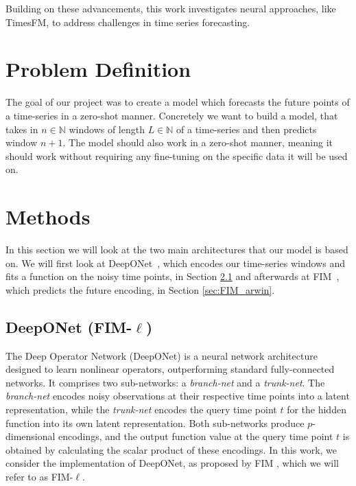 \documentclass{article}
\theoremstyle{plain}
\theoremstyle{definition}
\theoremstyle{remark}
\begin{document}
Building on these advancements, this work investigates neural approaches, like TimesFM, to address challenges in time series forecasting.

\section{Problem Definition}
The goal of our project was to create a model which forecasts the future points of a time-series in a zero-shot manner. Concretely we want to build a model, that takes in $n \in \mathbb{N}$ windows of length $L\in \mathbb{N}$ of a time-series and then predicts window $n+1$. The model should also work in a zero-shot manner, meaning it should work without requiring any fine-tuning on the specific data it will be used on. 

\section{Methods}
In this section we will look at the two main architectures that our model is based on. We will first look at DeepONet~\cite{Deeponet}, which encodes our time-series windows and fits a function on the noisy time points, in Section \ref{sec:DeepONet} and afterwards at FIM~\cite{fim-l}, which predicts the future encoding, in Section \ref{sec:FIM_arwin}.

\subsection{DeepONet (FIM-$\ell$)}\label{sec:DeepONet}
The Deep Operator Network (DeepONet) \cite{Deeponet} is a neural network architecture designed to learn nonlinear operators, outperforming standard fully-connected networks. It comprises two sub-networks: a \emph{branch-net} and a \emph{trunk-net}. 
The \emph{branch-net} encodes noisy observations at their respective time points into a latent representation, while the \emph{trunk-net} encodes the query time point \( t \) for the hidden function into its own latent representation. Both sub-networks produce \( p \)-dimensional encodings, and the output function value at the query time point \( t \) is obtained by calculating the scalar product of these encodings.
In this work, we consider the implementation of DeepONet, as proposed by FIM \cite{fim-l}, which we will refer to as FIM-\(\ell\).
\end{document}
